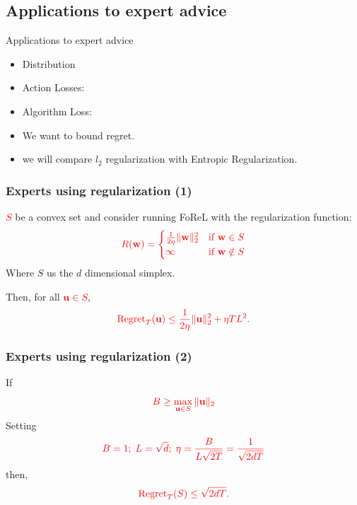 \documentclass[handout]{beamer}
\begin{document}
\begin{small}
\subsection{Applications to expert advice}

\begin{frame}{Applications to expert advice}
  \begin{itemize}
    \item Distribution 
    \item Action Losses: 
    \item Algorithm Loss: 
    \item We want to bound regret.
    \item we will compare $l_2$ regularization with Entropic
      Regularization.
  \end{itemize}
\end{frame}


\begin{frame}
    \frametitle{Experts using  regularization (1)}
    \textcolor{red}{$S$} 
    be a convex set and consider running FoReL with the regularization function:
    \[
    \textcolor{red}{R(\mathbf{w}) = 
    \begin{cases} 
    \frac{1}{2\eta} \|\mathbf{w}\|_2^2 & \text{if } \mathbf{w} \in S \\ 
    \infty & \text{if } \mathbf{w} \notin S 
    \end{cases}}
    \]
    Where $S$ us the $d$ dimensional simplex.

    Then, for all 
    \textcolor{red}{$\mathbf{u} \in S$},
    \[
    \textcolor{red}{\operatorname{Regret}_T(\mathbf{u}) \leq \frac{1}{2\eta} \|\mathbf{u}\|_2^2 + \eta T L^2.}
    \]
\end{frame}

\begin{frame}
    \frametitle{Experts using  regularization (2)}
    If 
    \[
    \textcolor{red}{B \geq \max_{\mathbf{u} \in S} \|\mathbf{u}\|_2}
    \]
    Setting
    \[
    \textcolor{red}{B=1;\; L=\sqrt{d};\;\eta = \frac{B}{L \sqrt{2T}}=\frac{1}{\sqrt{2dT}}}
    \]
    then,
    \[
    \textcolor{red}{\operatorname{Regret}_T(S) \leq \sqrt{2dT}.}
    \]
\end{frame}



\end{small}
\end{document}
